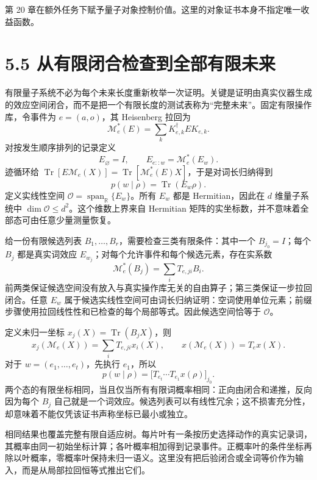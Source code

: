 \documentclass[
  11pt,
  oneside]{book}
\begin{document}
第 20
章在额外任务下赋予量子对象控制价值。这里的对象证书本身不指定唯一收益函数。

\hypertarget{ux4eceux6709ux9650ux95edux5408ux68c0ux67e5ux5230ux5168ux90e8ux6709ux9650ux672aux6765}{%
\section{5.5
从有限闭合检查到全部有限未来}\label{ux4eceux6709ux9650ux95edux5408ux68c0ux67e5ux5230ux5168ux90e8ux6709ux9650ux672aux6765}}

有限量子系统不必为每个未来长度重新枚举一次证明。关键是证明由真实仪器生成的效应空间闭合，而不是把一个有限长度的测试表称为``完整未来''。固定有限操作库，令事件为
\(e=(a,o)\)，其 Heisenberg 拉回为 \[
\mathcal M_e^*(E)=\sum_kK_{e,k}^\dagger E K_{e,k}.
\] 对按发生顺序排列的记录定义 \[
E_{\varnothing}=I,\qquad E_{e::w}=\mathcal M_e^*(E_w).
\] 迹循环给
\(\operatorname{Tr}[E\mathcal M_e(X)]=\operatorname{Tr}[\mathcal M_e^*(E)X]\)，于是对词长归纳得到
\[
p(w\mid\rho)=\operatorname{Tr}(E_w\rho).
\] 定义实线性空间
\(\mathcal O=\operatorname{span}_{\mathbb R}\{E_w\}\)。所有 \(E_w\) 都是
Hermitian，因此在 \(d\) 维量子系统中
\(\dim\mathcal O\le d^2\)。这个维数上界来自 Hermitian
矩阵的实坐标数，并不意味着全部态可由任意少量测量恢复。

给一份有限候选列表 \(B_1,\ldots,B_r\)，需要检查三类有限条件：其中一个
\(B_{j_0}=I\)；每个 \(B_j\) 都是真实词效应
\(E_{w_j}\)；对每个允许事件和每个候选元素，存在实系数 \[
\mathcal M_e^*(B_j)=\sum_iT_{e,ji}B_i.
\]
前两类保证候选空间没有放入与真实操作库无关的自由算子；第三类保证一步拉回闭合。任意
\(E_w\)
属于候选实线性空间可由词长归纳证明：空词使用单位元素；前缀步骤使用拉回线性性和已检查的每个局部等式。因此候选空间恰等于
\(\mathcal O\)。

定义未归一坐标 \(x_j(X)=\operatorname{Tr}(B_jX)\)，则 \[
x_j(\mathcal M_e(X))=\sum_iT_{e,ji}x_i(X),\qquad
x(\mathcal M_e(X))=T_ex(X).
\] 对于 \(w=(e_1,\ldots,e_t)\)，先执行 \(e_1\)，所以 \[
p(w\mid\rho)=\bigl[T_{e_t}\cdots T_{e_1}x(\rho)\bigr]_{j_0}.
\]
两个态的有限坐标相同，当且仅当所有有限词概率相同：正向由闭合和递推，反向因为每个
\(B_j\)
自己就是一个词效应。候选列表可以有线性冗余；这不损害充分性，却意味着不能仅凭该证书声称坐标已最小或独立。

相同结果也覆盖完整有限自适应树。每片叶有一条按历史选择动作的真实记录词，其概率由同一初始坐标计算；各叶概率相加得到记录事件。正概率叶的条件坐标再除以叶概率，零概率叶保持未归一语义。这里没有把后验闭合或全词等价作为输入，而是从局部拉回恒等式推出它们。
\end{document}
